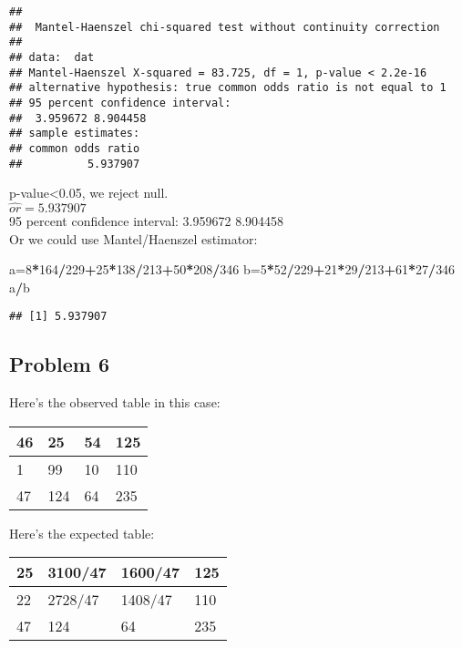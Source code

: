 \documentclass[]{article}
\newenvironment{Shaded}{\begin{snugshade}}{\end{snugshade}}
\newcommand{\DecValTok}[1]{\textcolor[rgb]{0.00,0.00,0.81}{#1}}
\newcommand{\OperatorTok}[1]{\textcolor[rgb]{0.81,0.36,0.00}{\textbf{#1}}}
\newcommand{\NormalTok}[1]{#1}
\begin{document}
\begin{verbatim}
## 
##  Mantel-Haenszel chi-squared test without continuity correction
## 
## data:  dat
## Mantel-Haenszel X-squared = 83.725, df = 1, p-value < 2.2e-16
## alternative hypothesis: true common odds ratio is not equal to 1
## 95 percent confidence interval:
##  3.959672 8.904458
## sample estimates:
## common odds ratio 
##          5.937907
\end{verbatim}

p-value\textless{}0.05, we reject null.\\
\(\hat{or}=5.937907\)\\
95 percent confidence interval: 3.959672 8.904458\\
Or we could use Mantel/Haenszel estimator:

\begin{Shaded}
\begin{Highlighting}[]
\NormalTok{a=}\DecValTok{8}\OperatorTok{*}\DecValTok{164}\OperatorTok{/}\DecValTok{229}\OperatorTok{+}\DecValTok{25}\OperatorTok{*}\DecValTok{138}\OperatorTok{/}\DecValTok{213}\OperatorTok{+}\DecValTok{50}\OperatorTok{*}\DecValTok{208}\OperatorTok{/}\DecValTok{346}
\NormalTok{b=}\DecValTok{5}\OperatorTok{*}\DecValTok{52}\OperatorTok{/}\DecValTok{229}\OperatorTok{+}\DecValTok{21}\OperatorTok{*}\DecValTok{29}\OperatorTok{/}\DecValTok{213}\OperatorTok{+}\DecValTok{61}\OperatorTok{*}\DecValTok{27}\OperatorTok{/}\DecValTok{346}
\NormalTok{a}\OperatorTok{/}\NormalTok{b}
\end{Highlighting}
\end{Shaded}

\begin{verbatim}
## [1] 5.937907
\end{verbatim}

\subsection{Problem 6}\label{problem-6}

Here's the observed table in this case:

\begin{longtable}[]{@{}llll@{}}
\toprule
46 & 25 & 54 & 125\tabularnewline
\midrule
\endhead
1 & 99 & 10 & 110\tabularnewline
47 & 124 & 64 & 235\tabularnewline
\bottomrule
\end{longtable}

Here's the expected table:

\begin{longtable}[]{@{}llll@{}}
\toprule
25 & 3100/47 & 1600/47 & 125\tabularnewline
\midrule
\endhead
22 & 2728/47 & 1408/47 & 110\tabularnewline
47 & 124 & 64 & 235\tabularnewline
\bottomrule
\end{longtable}
\end{document}
